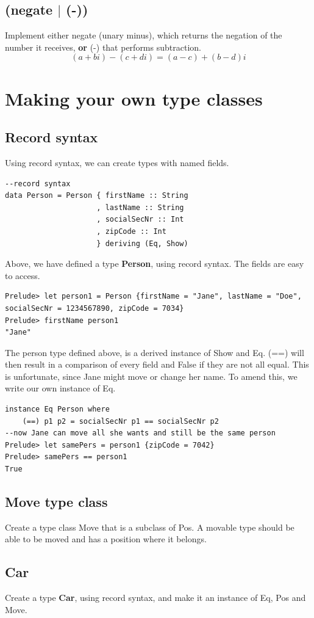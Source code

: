 \documentclass{article}
\begin{document}
\subsection{(negate $|$ (-))}
Implement either negate (unary minus), which returns the negation of the number it receives, \textbf{or} (-) that performs subtraction.
\[(a+bi)-(c+di)=(a-c)+(b-d)i\]

\section{Making your own type classes}

\subsection{Record syntax}
Using record syntax, we can create types with named fields.
\begin{lstlisting}
--record syntax
data Person = Person { firstName :: String
                     , lastName :: String
                     , socialSecNr :: Int
                     , zipCode :: Int
                     } deriving (Eq, Show)
\end{lstlisting}
Above, we have defined a type \textbf{Person}, using record syntax. The fields are easy to access.
\begin{lstlisting}
Prelude> let person1 = Person {firstName = "Jane", lastName = "Doe", socialSecNr = 1234567890, zipCode = 7034}
Prelude> firstName person1
"Jane"
\end{lstlisting}
The person type defined above, is a derived instance of Show and Eq. (==) will then result in a comparison of every field and False if they are not all equal. This is unfortunate, since Jane might move or change her name. To amend this, we write our own instance of Eq.
\begin{lstlisting}
instance Eq Person where
    (==) p1 p2 = socialSecNr p1 == socialSecNr p2
--now Jane can move all she wants and still be the same person
Prelude> let samePers = person1 {zipCode = 7042}
Prelude> samePers == person1
True
\end{lstlisting}
\subsection{Move type class}
Create a type class Move that is a subclass of Pos. A movable type should be able to be moved and has a position where it belongs.

\subsection{Car}
Create a type \textbf{Car}, using record syntax, and make it an instance of Eq, Pos and Move.
\end{document}

